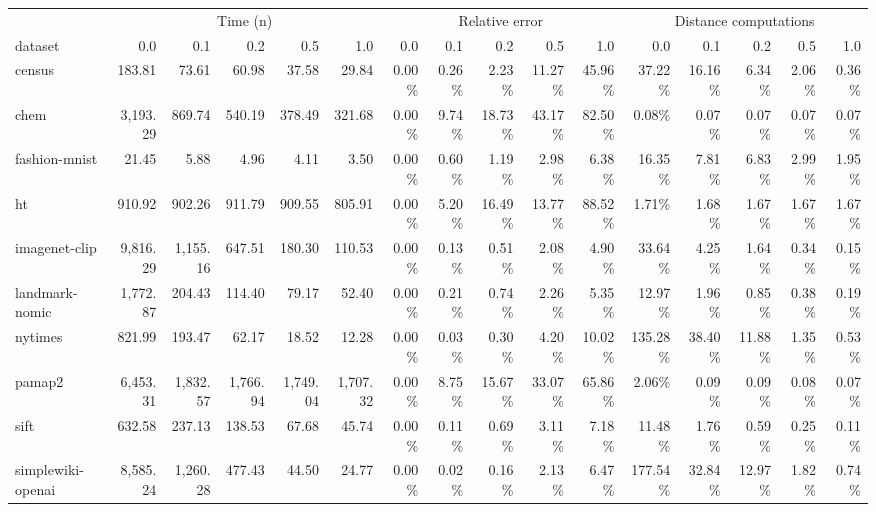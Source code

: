 \begin{table}[!t]


\fontsize{12.0pt}{14.4pt}\selectfont

\begin{tabular*}{\linewidth}{@{\extracolsep{\fill}}lrrrrrrrrrrrrrrr}
\toprule
 & \multicolumn{5}{c}{Time (n)} & \multicolumn{5}{c}{Relative error} & \multicolumn{5}{c}{Distance computations} \\ 
\cmidrule(lr){2-6} \cmidrule(lr){7-11} \cmidrule(lr){12-16}
dataset & 0.0 & 0.1 & 0.2 & 0.5 & 1.0 & 0.0 & 0.1 & 0.2 & 0.5 & 1.0 & 0.0 & 0.1 & 0.2 & 0.5 & 1.0 \\ 
\midrule\addlinespace[2.5pt]
census & 183.81 & 73.61 & 60.98 & 37.58 & 29.84 & 0.00\% & 0.26\% & 2.23\% & 11.27\% & 45.96\% & 37.22\% & 16.16\% & 6.34\% & 2.06\% & 0.36\% \\
chem & 3,193.29 & 869.74 & 540.19 & 378.49 & 321.68 & 0.00\% & 9.74\% & 18.73\% & 43.17\% & 82.50\% & 0.08\% & 0.07\% & 0.07\% & 0.07\% & 0.07\% \\
fashion-mnist & 21.45 & 5.88 & 4.96 & 4.11 & 3.50 & 0.00\% & 0.60\% & 1.19\% & 2.98\% & 6.38\% & 16.35\% & 7.81\% & 6.83\% & 2.99\% & 1.95\% \\
ht & 910.92 & 902.26 & 911.79 & 909.55 & 805.91 & 0.00\% & 5.20\% & 16.49\% & 13.77\% & 88.52\% & 1.71\% & 1.68\% & 1.67\% & 1.67\% & 1.67\% \\
imagenet-clip & 9,816.29 & 1,155.16 & 647.51 & 180.30 & 110.53 & 0.00\% & 0.13\% & 0.51\% & 2.08\% & 4.90\% & 33.64\% & 4.25\% & 1.64\% & 0.34\% & 0.15\% \\
landmark-nomic & 1,772.87 & 204.43 & 114.40 & 79.17 & 52.40 & 0.00\% & 0.21\% & 0.74\% & 2.26\% & 5.35\% & 12.97\% & 1.96\% & 0.85\% & 0.38\% & 0.19\% \\
nytimes & 821.99 & 193.47 & 62.17 & 18.52 & 12.28 & 0.00\% & 0.03\% & 0.30\% & 4.20\% & 10.02\% & 135.28\% & 38.40\% & 11.88\% & 1.35\% & 0.53\% \\
pamap2 & 6,453.31 & 1,832.57 & 1,766.94 & 1,749.04 & 1,707.32 & 0.00\% & 8.75\% & 15.67\% & 33.07\% & 65.86\% & 2.06\% & 0.09\% & 0.09\% & 0.08\% & 0.07\% \\
sift & 632.58 & 237.13 & 138.53 & 67.68 & 45.74 & 0.00\% & 0.11\% & 0.69\% & 3.11\% & 7.18\% & 11.48\% & 1.76\% & 0.59\% & 0.25\% & 0.11\% \\
simplewiki-openai & 8,585.24 & 1,260.28 & 477.43 & 44.50 & 24.77 & 0.00\% & 0.02\% & 0.16\% & 2.13\% & 6.47\% & 177.54\% & 32.84\% & 12.97\% & 1.82\% & 0.74\% \\
\bottomrule
\end{tabular*}

\end{table}

